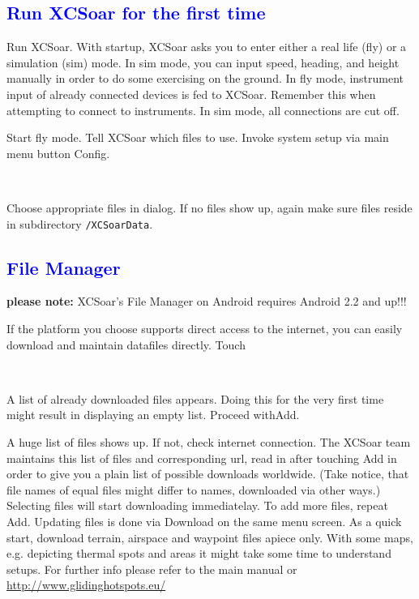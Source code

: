 \subsection{\textcolor{blue}{Run XCSoar for the first time}}
Run XCSoar. With startup, XCSoar asks you to enter either a real life (fly) or 
a simulation (sim) mode. In sim mode, you can input speed, heading, and height 
manually in order to do some exercising on the ground. In fly mode, instrument 
input of already connected devices is fed to XCSoar. Remember this when 
attempting to connect to instruments. In sim mode, all connections are cut 
off.

Start fly mode. Tell XCSoar which files to use. Invoke system setup via main 
menu button Config.

\begin{flushleft}\hspace*{1cm}\sk\blink{}\blink{}\\\end{flushleft}

Choose appropriate files in dialog. If no files show up, again make sure files 
reside in subdirectory \verb+/XCSoarData+.

\subsection{\textcolor{blue}{File Manager}}
\textbf{please note:} XCSoar's File Manager on Android requires Android 2.2 
and up!!!

If the platform you choose supports direct access to the internet, you can 
easily download and maintain datafiles directly. Touch 

\begin{flushleft}\hspace*{1cm}\\\end{flushleft}
A list of already downloaded files appears.  Doing this for the very first 
time might result in displaying an empty list. Proceed with\blink Add.

A huge list of files shows up. If not, check internet connection. The XCSoar 
team maintains this list of files and corresponding url, read in after 
touching \blink Add in order to give you a plain list of possible downloads 
worldwide. (Take notice, that file names of equal files might differ to names, 
downloaded via other ways.)
Selecting files will start downloading immediatelay. To add more files, repeat 
\blink Add.
Updating files is done via \blink Download on the same menu screen.  As a 
quick start, download terrain, airspace and waypoint files apiece only. With 
some maps, e.g. depicting thermal spots and areas it might take some time to 
understand setups. For further info please refer to the main manual or 
\url{http://www.glidinghotspots.eu/} 

